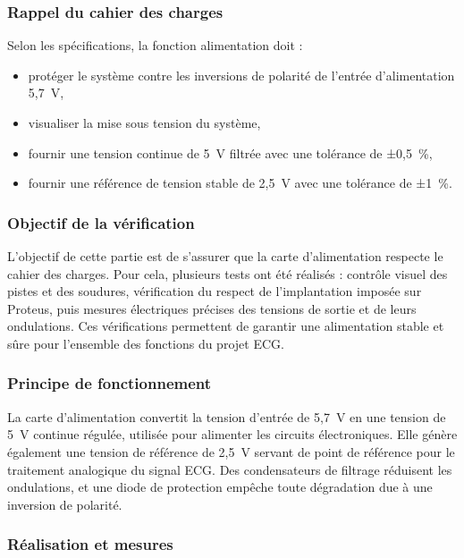 \documentclass{article}
\begin{document}
\subsubsection{Rappel du cahier des charges}

Selon les spécifications, la fonction alimentation doit :
\begin{itemize}
    \item protéger le système contre les inversions de polarité de l’entrée d’alimentation 5,7~V,
    \item visualiser la mise sous tension du système,
    \item fournir une tension continue de 5~V filtrée avec une tolérance de ±0,5~\%,
    \item fournir une référence de tension stable de 2,5~V avec une tolérance de ±1~\%.
\end{itemize}

\subsubsection{Objectif de la vérification}

L’objectif de cette partie est de s’assurer que la carte d’alimentation respecte le cahier des charges. Pour cela, plusieurs tests ont été réalisés : contrôle visuel des pistes et des soudures, vérification du respect de l’implantation imposée sur Proteus, puis mesures électriques précises des tensions de sortie et de leurs ondulations. Ces vérifications permettent de garantir une alimentation stable et sûre pour l’ensemble des fonctions du projet ECG.

\subsubsection{Principe de fonctionnement}

La carte d’alimentation convertit la tension d’entrée de 5,7~V en une tension de 5~V continue régulée, utilisée pour alimenter les circuits électroniques. Elle génère également une tension de référence de 2,5~V servant de point de référence pour le traitement analogique du signal ECG. Des condensateurs de filtrage réduisent les ondulations, et une diode de protection empêche toute dégradation due à une inversion de polarité.

\subsubsection{Réalisation et mesures}
\end{document}
